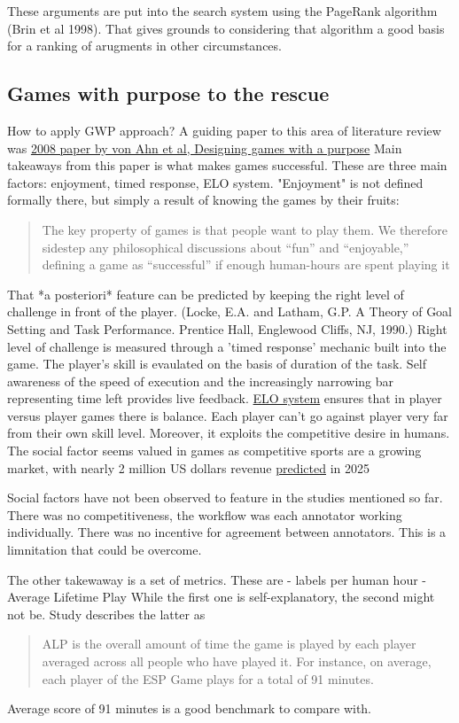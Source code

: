\documentclass{article}
\begin{document}
These arguments are put into the search system using the PageRank algorithm (Brin et al 1998).  That gives grounds to considering that algorithm a good basis for a ranking of arugments in other circumstances.

\subsection{Games with purpose to the rescue}
How to apply GWP approach?
A guiding paper to this area of literature review was \href{https://dl.acm.org/doi/10.1145/1378704.1378719}{2008 paper by von Ahn et al, Designing games with a purpose} 
Main takeaways from this paper is what makes games successful.
These are three main factors: enjoyment, timed response, ELO system.
"Enjoyment" is not defined formally there, but simply a result of knowing the games by their fruits:
\begin{quote}
 The key property of games is that people want to play them. We therefore sidestep any philosophical discussions about “fun” and “enjoyable,” defining a game as “successful” if enough human-hours are spent playing it
\end{quote}
That  *a posteriori* feature can be predicted by keeping the right level of challenge in front of the player. (Locke, E.A. and Latham, G.P. A Theory of Goal Setting and Task Performance. Prentice Hall, Englewood Cliffs, NJ, 1990.)
Right level of challenge is measured through a 'timed response' mechanic built into the game.
The player's skill is evaulated on the basis of duration of the task. 
Self awareness of the speed of execution and the increasingly narrowing bar representing time left provides live feedback.
\href{https://en.wikipedia.org/wiki/Elo_rating_system}{ELO system} ensures that in player versus player games there is balance. Each player can't go against player very far from their own skill level.
Moreover, it exploits the competitive desire in humans.
The social factor seems valued in games as competitive sports are a growing market, with nearly 2 million US dollars revenue \href{https://www.statista.com/statistics/490522/global-esports-market-revenue/}{predicted} in 2025

Social factors have not been observed to feature in the studies mentioned so far.
There was no competitiveness, the workflow was each annotator working individually.
There was no incentive for agreement between annotators.
This is a limnitation that could be overcome.

The other takewaway is a set of metrics. These are
- labels per human hour
- Average Lifetime Play
While the first one is self-explanatory, the second might not be.
Study describes the latter as 
\begin{quote}
 ALP is the overall amount of time the game is played by each player averaged across all people who have played it. For instance, on average, each player of the ESP Game plays for a total of 91 minutes.
\end{quote}
Average score of 91 minutes is a good benchmark to compare with.
\end{document}
